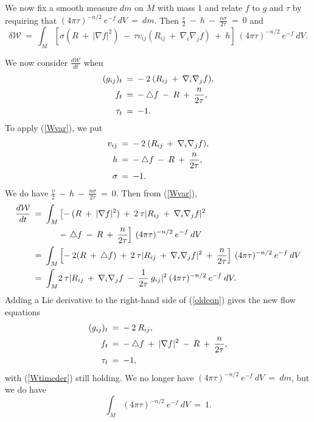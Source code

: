We now fix a smooth measure $dm$ on $M$ with mass $1$ and
relate $f$ to $g$ and $\tau$ by
requiring that $(4 \pi \tau)^{-n/2} \: e^{-f} \: dV \: =\: dm$. Then
$\frac{v}{2} \: - \: h \: - \: \frac{n\sigma}{2\tau} \: = \: 0$ and
\begin{equation} \label{Wvar}
\delta {\mathcal W} \: = \: \int_M  \left[ \sigma  (R \: + \: |\nabla f|^2) \:
- \: \tau v_{ij} (R_{ij} \: + \: \nabla_i \nabla_j f) \: + \: h \right] \:
(4 \pi \tau)^{-n/2} \: e^{-f} \: dV.
\end{equation}

We now consider $\frac{d{\mathcal W}}{dt}$ when
\begin{align} \label{oldeqn}
(g_{ij})_t \: & = \: - \: 2 \: (R_{ij} \: + \: \nabla_i \nabla_j f ), \\
f_t \: & = \: - \: \triangle f \: - \: R \: + \: \frac{n}{2\tau}, \notag \\
\tau_t \: & = \: -1. \notag
\end{align}
To apply (\ref{Wvar}), we put
\begin{align}
v_{ij} \: & = \: - \: 2 \: (R_{ij} \: + \: \nabla_i \nabla_j f ), \\
h \: & = \: - \: \triangle f \: - \: R \: + \: \frac{n}{2\tau}, \notag \\
\sigma \: & = \: -1. \notag
\end{align}
We do have
$\frac{v}{2} \: - \: h \: - \: \frac{n\sigma}{2\tau} \: = \: 0$.
Then from (\ref{Wvar}),
\begin{align} \label{Wtimeder}
\frac{d{\mathcal W}}{dt} \: = \:
\int_M & \left[- \:  (R \: + \: |\nabla f|^2)
\: + \: 2 \: \tau |R_{ij} \: + \: \nabla_i \nabla_j f|^2 \:
\right. \\
& -\left. \triangle f \: - \: R \: + \: \frac{n}{2\tau}
 \right] \:
(4 \pi \tau)^{-n/2} \: e^{-f} \: dV \notag \\
= \:
\int_M & \left[- \:  2(R \: + \: \triangle f)
\: + \: 2 \: \tau |R_{ij} \: + \: \nabla_i \nabla_j f|^2
\: + \: \frac{n}{2\tau}
 \right] \:
(4 \pi \tau)^{-n/2} \: e^{-f} \: dV \notag \\
= \: \int_M &
2 \: \tau |R_{ij} \: + \: \nabla_i \nabla_j f
\: - \: \frac{1}{2\tau} \: g_{ij}|^2 \:
(4 \pi \tau)^{-n/2} \: e^{-f} \: dV. \notag
\end{align}
Adding a Lie derivative to the right-hand side of
(\ref{oldeqn}) gives the new flow equations
\begin{align} \label{neweqn}
(g_{ij})_t \: & = \: - \: 2 \: R_{ij}, \\
f_t \: & = \: - \: \triangle f \: + \: |\nabla f|^2
\: - \: R \: + \: \frac{n}{2\tau}, \notag \\
\tau_t \: & = \: -1, \notag
\end{align}
with (\ref{Wtimeder}) still holding. We no longer have
$(4 \pi \tau)^{-n/2} \: e^{-f} \: dV \: = \: dm$, but we do have
\begin{equation} \label{Wnorm}
\int_M (4 \pi \tau)^{-n/2} \: e^{-f} \: dV \: = \: 1.
\end{equation}


